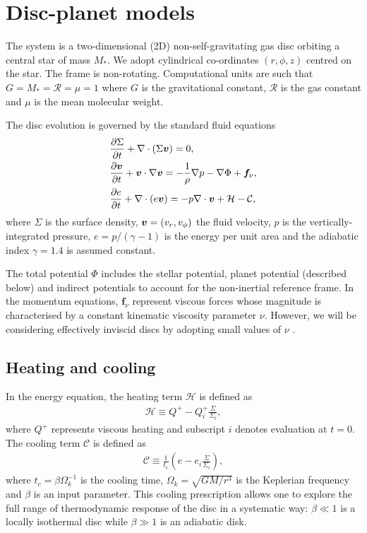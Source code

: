 \section{Disc-planet models}\label{model}
The system is a two-dimensional (2D) non-self-gravitating gas disc orbiting
a central star of mass $M_*$. We adopt cylindrical
co-ordinates $(r,\phi,z)$ centred on the star. The frame is   
non-rotating. Computational units are such that 
$G=M_*=\mathcal{R}=\mu=1$ where $G$ is the gravitational constant,
$\mathcal{R}$ is the gas constant and $\mu$ is the mean molecular
weight. 

The disc evolution is governed by the standard fluid equations  
\begin{align}\label{3d_gov_eq}
  &\frac{\p\Sigma}{\p t}+\nabla\cdot(\Sigma \bv)=0, \\
  & \frac{\p\bv}{\p t}+\bv\cdot\nabla\bv= -\frac{1}{\rho}\nabla p 
  - \nabla{\Phi} + \bm{f}_\nu,\\
  & \frac{\p e}{\p t} + \nabla\cdot(e\bv) = -p\nabla\cdot\bv +
  \mathcal{H} - \mathcal{C}, %
\end{align}
where $\Sigma$ is the surface density, $\bm{v} = (v_r,v_\phi)$ the fluid
velocity, $p$ is the vertically-integrated pressure, $e=p/(\gamma-1)$ is the energy
per unit area and the adiabatic index $\gamma=1.4$ is assumed
constant.  

The total potential $\Phi$ includes the stellar potential, planet potential
(described below) 
and indirect potentials to account for the non-inertial reference
frame. 
In the momentum 
equations, $\bm{f}_\nu$ represent viscous forces whose magnitude is 
characterised by a constant kinematic viscosity parameter
$\nu$. However, we will be considering effectively inviscid discs by
adopting small values of $\nu$ .  

\subsection{Heating and cooling}
In the energy equation, the heating term $\mathcal{H}$ is defined as 
\begin{align}
  \mathcal{H} \equiv Q^+ - Q^+_i\frac{\Sigma}{\Sigma_i}, 
\end{align}
where $Q^+$ represents viscous heating and subscript $i$ denotes
evaluation at $t=0$. The cooling term $\mathcal{C}$ is defined as
\begin{align}
  \mathcal{C} \equiv \frac{1}{t_c}\left(e -
  e_i\frac{\Sigma}{\Sigma_i}\right),  
\end{align}
where $t_c = \beta\Omega_k^{-1}$ is the cooling time,
$\Omega_k=\sqrt{GM/r^3}$ is the Keplerian frequency and $\beta$ is an
input parameter. This cooling prescription allows one 
to explore the full range of thermodynamic response of the disc in a 
systematic way: $\beta\ll1$ is a locally isothermal disc while
$\beta\gg1$ is an adiabatic disk.  



